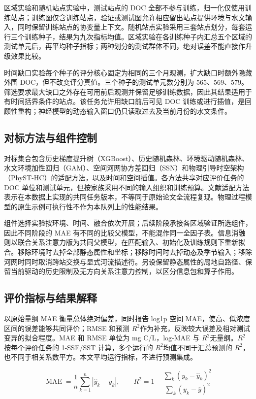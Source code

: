 \documentclass[UTF8,11pt,a4paper,fontset=none]{ctexart}
\begin{document}
区域实验和随机站点实验中，测试站点的 DOC 全部不参与训练，归一化仅使用训练站点；训练图仅含训练站点，验证或测试图允许相应留出站点提供环境与水文输入，同时保留训练站点的协变量上下文。随机站点实验采用三套站点划分，每套运行三个训练种子，结果为九次指标均值。区域实验在各训练种子内汇总五个区域的测试单元后，再平均种子指标；两种划分的测试群体不同，绝对误差不能直接作升级效果比较。


时间缺口实验每个种子的评分核心固定为相同的三个月观测，扩大缺口时额外隐藏外围 DOC，但不改变评分真值。三个种子的测试单元数分别为 565、569、579。筛选要求最大缺口之外存在可用前后观测并保留足够训练数据，因此其结果适用于有时间括界条件的站点。该任务允许用缺口前后可见 DOC 训练或进行插值，是回顾性重构；神经模型的动态输入窗口仍只读取过去及当前月份的水文条件。


\subsection{对标方法与组件控制}

对标集合包含历史梯度提升树（XGBoost）、历史随机森林、环境驱动随机森林、水文环境加性回归（GAM）、空间河网协方差回归（SSN）和物理引导时空架构（PhyST-HC）的适配方法，以及时间和空间插值。各方法共享对应评价任务的 DOC 单位和测试单元，但按家族采用不同的输入组织和训练预算。文献适配方法表示在本数据上实现的共同任务版本，不等同于原始论文全流程复现。物理过程模型的原生示例可执行性不作为本队列上的性能结果。


组件选择实验按环境、时间、融合依次开展；后续阶段承接各区域验证所选组件，因此不同阶段的 MAE 有不同的比较父模型，不能混作同一全因子表。信息消融则以联合关系注意力版为共同父模型，在匹配输入、初始化及训练规则下重新拟合。移除环境时去掉全部静态属性和坐标；移除时间时去掉动态及季节输入；移除河网时同时取消跨站交换与显式河流描述符。另设保留静态属性的局地自路径、保留当前驱动的历史限制及无方向关系注意力控制，以区分信息包和算子作用。


\subsection{评价指标与结果解释}

以原始量纲 MAE 衡量总体绝对偏差，同时报告 log1p 空间 MAE，使高、低浓度区间的误差能够共同评价；RMSE 和预测 $R^2$作为补充，反映较大误差及相对测试变异的拟合程度。MAE 和 RMSE 单位为 mg C/L，log-MAE 与 $R^2$无量纲。$R^2$按每个评价任务的 1-SSE/SST 计算，多个运行的 $R^2$均值不同于汇总预测的 $R^2$，也不同于相关系数平方。本文平均运行指标，不进行预测集成。


\begin{equation}
\operatorname{MAE}=\frac1n\sum_{k=1}^n|\widehat y_k-y_k|,\qquad R^2=1-\frac{\sum_k(y_k-\widehat y_k)^2}{\sum_k(y_k-\overline y)^2}
\end{equation}
\end{document}
